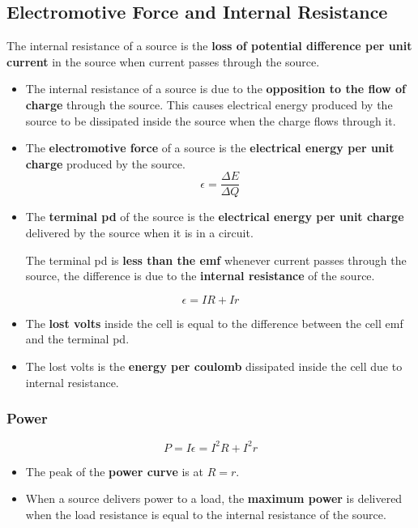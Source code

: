 \subsection{Electromotive Force and Internal Resistance}

The internal resistance of a source is the \textbf{loss of potential difference per unit current} in the source when current passes through the source.
\begin{itemize}
    \item The internal resistance of a source is due to the \textbf{opposition to the flow of charge} through the source. This causes electrical energy produced by the source to be dissipated inside the source when the charge flows through it.
    \item The \textbf{electromotive force} of a source is the \textbf{electrical energy per unit charge} produced by the source.
        $$\epsilon=\frac{\Delta E}{\Delta Q}$$
    \item The \textbf{terminal pd} of the source is the \textbf{electrical energy per unit charge} delivered by the source when it is in a circuit.

        The terminal pd is \textbf{less than the emf} whenever current passes through the source, the difference is due to the \textbf{internal resistance} of the source.
\end{itemize}
$$\epsilon=IR+Ir$$

\begin{itemize}
    \item The \textbf{lost volts} inside the cell is equal to the difference between the cell emf and the terminal pd.
    \item The lost volts is the \textbf{energy per coulomb} dissipated inside the cell due to internal resistance.
\end{itemize}

\subsubsection*{Power}
$$P=I\epsilon=I^2R+I^2r$$

\begin{itemize}
    \item The peak of the \textbf{power curve} is at $R=r$.
    \item When a source delivers power to a load, the \textbf{maximum power} is delivered when the load resistance is equal to the internal resistance of the source.
\end{itemize}

